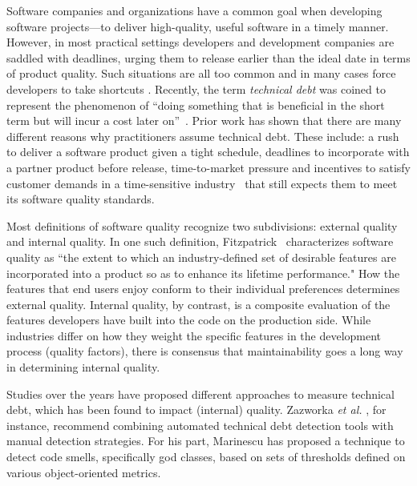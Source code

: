 

Software companies and organizations have a common goal when developing software projects---to deliver high-quality, useful software in a timely manner. However, in most practical settings developers and development companies are saddled with deadlines, urging them to release earlier than the ideal date in terms of product quality. Such situations are all too common and in many cases force developers to take shortcuts \cite{kruchten2013technical} \cite{seaman2015technical}. Recently, the term \emph{technical debt} was coined to represent the phenomenon of ``doing something that is beneficial in the short term but will incur a cost later on''~\cite{cunningham1993wycash}. Prior work has shown that there are many different reasons why practitioners assume technical debt. These include: a rush to deliver a software product given a tight schedule, deadlines to incorporate with a partner product before release, time-to-market pressure and incentives to satisfy customer demands in a time-sensitive industry~\cite{lim2012balancing} that still expects them to meet its software quality standards.
\par

Most definitions of software quality recognize two subdivisions: external quality and internal quality. In one such definition, Fitzpatrick~\cite{fitzpatrick1996software} characterizes software quality as ``the extent to which an industry-defined set of desirable features are incorporated into a product so as to enhance its lifetime performance." How the features that end users enjoy conform to their individual preferences determines external quality. Internal quality, by contrast, is a composite evaluation of the features developers have built into the code on the production side. While industries differ on how they weight the specific features in the development process (quality factors), there is consensus that maintainability goes a long way in determining internal quality.

Studies over the years have proposed different approaches to measure technical debt, which has been found to impact (internal) quality. Zazworka \textit{et al.} \cite{zazworka2011investigating}, for instance, recommend combining automated technical debt detection tools with manual detection strategies. For his part, Marinescu \cite{marinescu2004detection} has proposed a technique to detect code smells, specifically god classes, based on sets of thresholds defined on various object-oriented metrics.\par

